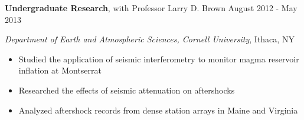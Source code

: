 

\vspace{7pt}

\textbf{Undergraduate Research}, with Professor Larry D. Brown \hfill August 2012 - May 2013

\textit{Department of Earth and Atmospheric Sciences, Cornell University}, Ithaca, NY

\begin{itemize}
    \item Studied the application of seismic interferometry to monitor magma reservoir inflation at Montserrat
    \item Researched the effects of seismic attenuation on aftershocks
    \item Analyzed aftershock records from dense station arrays in Maine and Virginia
\end{itemize}
